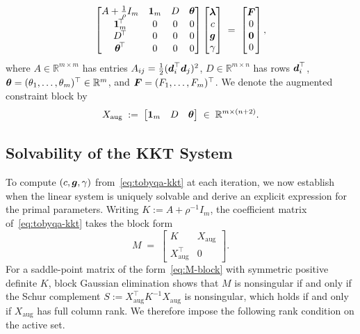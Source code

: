\begin{equation}\label{eq:tobyqa-kkt}
  \begin{bmatrix}
     A + \tfrac{1}{\rho}I_m & \mathbf{1}_m & D & \boldsymbol{\theta} \\
    \mathbf{1}_m^{\!\top} & 0 & 0 & 0 \\
    D^{\!\top} & 0 & 0 & 0 \\
    \boldsymbol{\theta}^{\!\top} & 0 & 0 & 0
  \end{bmatrix}
  \begin{bmatrix}\boldsymbol{\lambda}\\c\\\boldsymbol{g}\\\gamma\end{bmatrix}
  \;=\;
  \begin{bmatrix}\boldsymbol{F}\\0\\\boldsymbol{0}\\0\end{bmatrix},
\end{equation}
where $A \in \mathbb{R}^{m\times m}$ has entries $A_{ij} = \tfrac{1}{2}(\boldsymbol{d}_i^\top \boldsymbol{d}_j)^2$, $D \in \mathbb{R}^{m\times n}$ has rows $\boldsymbol{d}_i^\top$, $\boldsymbol{\theta} = (\theta_1, \dots, \theta_m)^\top \in \mathbb{R}^m$, and $\boldsymbol{F} = (F_1, \dots, F_m)^\top$. We denote the augmented constraint block by
\begin{equation*}
  X_{\mathrm{aug}} \;:=\;
  \begin{bmatrix}\mathbf{1}_m & D & \boldsymbol{\theta}\end{bmatrix}
  \;\in\;\mathbb{R}^{m\times(n+2)}.
\end{equation*}

\subsection{Solvability of the KKT System}
\label{sec:well-posedness}

To compute $(c, \boldsymbol{g}, \gamma)$ from~\eqref{eq:tobyqa-kkt} at each iteration, we now establish when the linear system is uniquely solvable and derive an explicit expression for the primal parameters. Writing $K := A + \rho^{-1} I_m$, the coefficient matrix of~\eqref{eq:tobyqa-kkt} takes the block form
\begin{equation}\label{eq:M-block}
  M \;=\;
  \begin{bmatrix}
    K & X_{\mathrm{aug}} \\
    X_{\mathrm{aug}}^\top & 0
  \end{bmatrix}.
\end{equation}
For a saddle-point matrix of the form~\eqref{eq:M-block} with symmetric positive definite $K$, block Gaussian elimination shows that $M$ is nonsingular if and only if the Schur complement $S := X_{\mathrm{aug}}^\top K^{-1} X_{\mathrm{aug}}$ is nonsingular, which holds if and only if $X_{\mathrm{aug}}$ has full column rank. We therefore impose the following rank condition on the active set.

